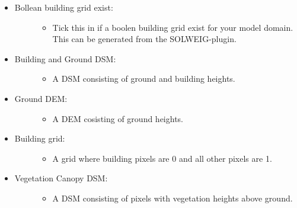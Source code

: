 \documentclass[letterpaper,10pt,english]{sphinxmanual}
\begin{document}
\begin{itemize}
\item {} \begin{description}
\item[{Bollean building grid exist:}] \leavevmode\begin{itemize}
\item {} 
Tick this in if a boolen building grid exist for your model domain. This can be generated from the SOLWEIG-plugin.

\end{itemize}

\end{description}

\item {} \begin{description}
\item[{Building and Ground DSM:}] \leavevmode\begin{itemize}
\item {} 
A DSM consisting of ground and building heights.

\end{itemize}

\end{description}

\item {} \begin{description}
\item[{Ground DEM:}] \leavevmode\begin{itemize}
\item {} 
A DEM cosisting of ground heights.

\end{itemize}

\end{description}

\item {} \begin{description}
\item[{Building grid:}] \leavevmode\begin{itemize}
\item {} 
A grid where building pixels are 0 and all other pixels are 1.

\end{itemize}

\end{description}

\item {} \begin{description}
\item[{Vegetation Canopy DSM:}] \leavevmode\begin{itemize}
\item {} 
A DSM consisting of pixels with vegetation heights above ground.


\end{itemize}
\end{description}
\end{itemize}
\end{document}
